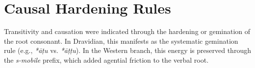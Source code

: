 \section{Causal Hardening Rules}
Transitivity and causation were indicated through the hardening or gemination of the root consonant. In Dravidian, this manifests as the systematic gemination rule (e.g., \textit{*āṭu} vs. \textit{*āṭṭu}). In the Western branch, this energy is preserved through the \textit{s-mobile} prefix, which added agential friction to the verbal root.
